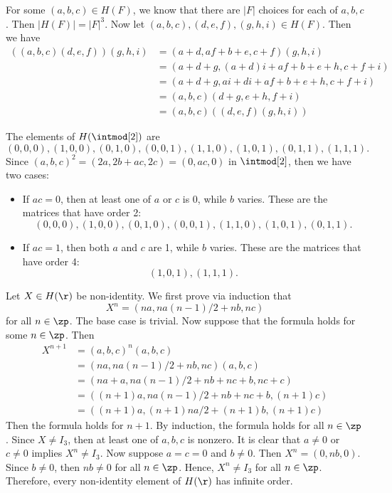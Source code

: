\begin{solalph}
    \item For some $(a, b, c) \in H(F)$, we know that there are $|F|$ choices for each of $a, b, c$. Then $|H(F)| = |F|^3$. Now let $(a, b, c), (d, e, f), (g, h, i) \in H(F)$. Then we have
    \begin{align*}
        ((a, b, c)(d, e, f))(g, h, i) & = (a + d, af + b + e, c + f)(g, h, i) \\
        & = (a + d + g, (a + d)i + af + b + e + h, c + f + i) \\
        & = (a + d + g, ai + di + af + b + e + h, c + f + i) \\
        & = (a, b, c)(d + g, e + h, f + i) \\
        & = (a, b, c)((d, e, f)(g, h, i))
    \end{align*}
    \item The elements of $H(\intmod[2])$ are
    \[ (0, 0, 0), (1, 0, 0), (0, 1, 0), (0, 0, 1), (1, 1, 0), (1, 0, 1), (0, 1, 1), (1, 1, 1).\]
    Since $(a, b, c)^2 = (2a, 2b + ac, 2c) = (0, ac, 0)$ in $\intmod[2]$, then we have two cases:
    \begin{itemize}
        \item If $ac = 0$, then at least one of $a$ or $c$ is 0, while $b$ varies. These are the matrices that have order 2:
        \[(0, 0, 0), (1, 0, 0), (0, 1, 0), (0, 0, 1), (1, 1, 0), (1, 0, 1), (0, 1, 1).\]
        \item If $ac = 1$, then both $a$ and $c$ are 1, while $b$ varies. These are the matrices that have order 4:
        \[(1, 0, 1), (1, 1, 1).\]
    \end{itemize}
    \item Let $X \in H(\r)$ be non-identity. We first prove via induction that
    \[X^n = (na, na(n - 1)/2 + nb, nc)\]
    for all $n \in \zp$. The base case is trivial. Now suppose that the formula holds for some $n \in \zp$. Then
    \begin{align*}
        X^{n + 1} & = (a, b, c)^n(a, b, c) \\
        & = (na, na(n - 1)/2 + nb, nc)(a, b, c) \\
        & = (na + a, na(n - 1)/2 + nb + nc + b, nc + c) \\
        & = ((n + 1)a, na(n - 1)/2 + nb + nc + b, (n + 1)c) \\
        & = ((n + 1)a, (n + 1)na/2 + (n + 1)b, (n + 1)c)
    \end{align*}
    Then the formula holds for $n + 1$. By induction, the formula holds for all $n \in \zp$. Since $X \neq I_3$, then at least one of $a, b, c$ is nonzero. It is clear that $a \neq 0$ or $c \neq 0$ implies $X^n \neq I_3$. Now suppose $a = c = 0$ and $b \neq 0$. Then $X^n = (0, nb, 0)$. Since $b \neq 0$, then $nb \neq 0$ for all $n \in \zp$. Hence, $X^n \neq I_3$ for all $n \in \zp$. Therefore, every non-identity element of $H(\r)$ has infinite order.
\end{solalph}

